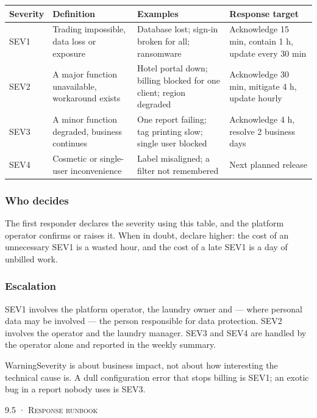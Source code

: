\documentclass[11pt,a4paper,oneside]{book}
\begin{document}
\begin{center}\small
\begin{tabularx}{\linewidth}{|X|X|X|X|}
\hline
\rowcolor{lightgrey}
\textbf{Severity} & \textbf{Definition} & \textbf{Examples} & \textbf{Response target} \\ \hline
SEV1 & Trading impossible, data loss or exposure & Database lost; sign-in broken for all; ransomware & Acknowledge 15 min, contain 1 h, update every 30 min \\ \hline
SEV2 & A major function unavailable, workaround exists & Hotel portal down; billing blocked for one client; region degraded & Acknowledge 30 min, mitigate 4 h, update hourly \\ \hline
SEV3 & A minor function degraded, business continues & One report failing; tag printing slow; single user blocked & Acknowledge 4 h, resolve 2 business days \\ \hline
SEV4 & Cosmetic or single-user inconvenience & Label misaligned; a filter not remembered & Next planned release \\ \hline
\end{tabularx}
\end{center}
\subsubsection*{Who decides}
The first responder declares the severity using this table, and the platform operator confirms or raises it. When in doubt, declare higher: the cost of an unnecessary SEV1 is a wasted hour, and the cost of a late SEV1 is a day of unbilled work.

\subsubsection*{Escalation}
SEV1 involves the platform operator, the laundry owner and — where personal data may be involved — the person responsible for data protection. SEV2 involves the operator and the laundry manager. SEV3 and SEV4 are handled by the operator alone and reported in the weekly summary.

\begin{notebox}WarningSeverity is about business impact, not about how interesting the technical cause is. A dull configuration error that stops billing is SEV1; an exotic bug in a report nobody uses is SEV3.\end{notebox}
\textsc{\small\color{crimson}9.5 · Response runbook}\par\medskip
\end{document}
